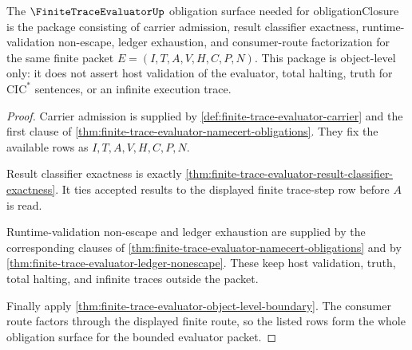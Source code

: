 \begin{theorem}
\label{thm:finite-trace-evaluator-obligation-upgrade-package}
The $\FiniteTraceEvaluatorUp$ obligation surface needed for
obligationClosure is the package consisting of carrier admission, result
classifier exactness, runtime-validation non-escape, ledger exhaustion, and
consumer-route factorization for the same finite packet $E=(I,T,A,V,H,C,P,N)$.
This package is object-level only: it does not assert host validation of the
evaluator, total halting, truth for $\mathrm{CIC}^{*}$ sentences, or an
infinite execution trace.
\end{theorem}
\begin{proof}
Carrier admission is supplied by
\autoref{def:finite-trace-evaluator-carrier} and the first clause of
\autoref{thm:finite-trace-evaluator-namecert-obligations}. They fix the
available rows as $I,T,A,V,H,C,P,N$.

Result classifier exactness is exactly
\autoref{thm:finite-trace-evaluator-result-classifier-exactness}. It ties
accepted results to the displayed finite trace-step row before $A$ is read.

Runtime-validation non-escape and ledger exhaustion are supplied by the
corresponding clauses of \autoref{thm:finite-trace-evaluator-namecert-obligations}
and by \autoref{thm:finite-trace-evaluator-ledger-nonescape}. These keep host
validation, truth, total halting, and infinite traces outside the packet.

Finally apply \autoref{thm:finite-trace-evaluator-object-level-boundary}. The
consumer route factors through the displayed finite route, so the listed rows
form the whole obligation surface for the bounded evaluator packet.
\end{proof}

